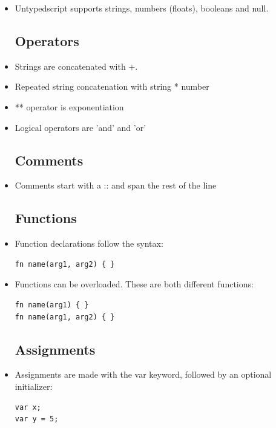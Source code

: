 \documentclass[12pt,a4paper]{article}
\begin{document}
\begin{itemize}
\subsection{Data types}
\item Untypedscript supports strings, numbers (floats), booleans and null.

\subsection{Operators}
\item Strings are concatenated with +.  
\item Repeated string concatenation with string * number
\item ** operator is exponentiation
\item Logical operators are 'and' and 'or'

\subsection{Comments}
\item Comments start with a :: and span the rest of the line

\subsection{Functions}
\item Function declarations follow the syntax:
\begin{lstlisting}
fn name(arg1, arg2) { }
\end{lstlisting}

\item Functions can be overloaded. These are both different functions:
\begin{lstlisting}
fn name(arg1) { }
fn name(arg1, arg2) { }
\end{lstlisting}

\subsection{Assignments}
\item Assignments are made with the var keyword, followed by an optional initializer:
\begin{lstlisting}
var x;
var y = 5;
\end{lstlisting}


\end{itemize}
\end{document}
